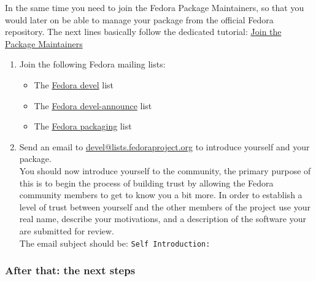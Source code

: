 In the same time you need to join the Fedora Package Maintainers, so that you would later on be able to manage your package from the official Fedora repository. 
The next lines basically follow the dedicated tutorial: \href{https://docs.fedoraproject.org/en-US/package-maintainers/Joining\_the\_Package\_Maintainers/}{Join the Package Maintainers}
\begin{enumerate}
\item Join the following Fedora mailing lists:
\begin{itemize}
\item The \href{https://lists.fedoraproject.org/archives/list/devel@lists.fedoraproject.org/}{Fedora devel} list 
\item The \href{https://lists.fedoraproject.org/admin/lists/devel-announce@lists.fedoraproject.org/}{Fedora devel-announce} list 
\item The \href{https://lists.fedoraproject.org/admin/lists/packaging@lists.fedoraproject.org/}{Fedora packaging} list 
\end{itemize}
\item Send an email to \href{mailto:devel@lists.fedoraproject.org}{devel@lists.fedoraproject.org} to introduce yourself and your package. \\[0.25cm]
You should now introduce yourself to the community, the primary purpose of this is to begin the process of building trust 
by allowing the Fedora community members to get to know you a bit more. 
In order to establish a level of trust between yourself and the other members of the project use your real name, describe your motivations, 
and a description of the software your are submitted for review. \\[0.25cm]
The email subject should be: \texttt{Self Introduction: }
\end{enumerate}

\newpage
\subsubsection{After that: the next steps}

